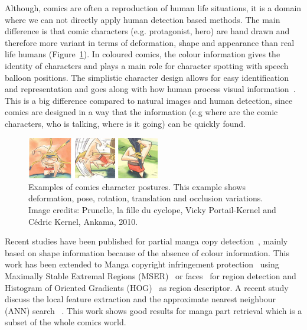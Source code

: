 Although, comics are often a reproduction of human life situations, it is a domain where we can not directly apply human detection based methods.
The main difference is that comic characters (e.g. protagonist, hero) are hand drawn and therefore more variant in terms of deformation, shape and appearance than real life humans (Figure~\ref{fig:sota:tarzan}).
In coloured comics, the colour information gives the identity of characters and plays a main role for character spotting with speech balloon positions. 
The simplistic character design allows for easy identification and representation and goes along with how human process visual information~\cite{ahmadimpactsOfManga,medley2010discerningPictures,cohn2010limits}.
This is a big difference compared to natural images and human detection, since comics are designed in a way that the information (e.g where are the comic characters, who is talking, where is it going) can be quickly found.%

 \begin{figure}[!ht]	%
 	 \centering
 	\includegraphics[width=220px]{figs/prunelle.png}
 	\caption[Illustration of the diversity of comics character postures]{Examples of comics character postures. This example shows deformation, pose, rotation, translation and occlusion variations. Image credits: Prunelle, la fille du cyclope, Vicky Portail-Kernel and C\'{e}dric Kernel, Ankama, 2010.
}
 	\label{fig:sota:tarzan}
 \end{figure}

Recent studies have been published for partial manga copy detection~\cite{Sun2010}, mainly based on shape information because of the absence of colour information.
This work has been extended to Manga copyright infringement protection~\cite{Sun2009Detecting,Sun2013IJDAR} using Maximally Stable Extremal Regions (MSER)~\cite{matas2004robust} or faces~\cite{Viola2004robust} for region detection and Histogram of Oriented Gradients (HOG)~\cite{Dalal05} as region descriptor.
A recent study discuss the local feature extraction and the approximate nearest neighbour (ANN) search~\cite{Iwata2014StudyManga} .
This work shows good results for manga part retrieval which is a subset of the whole comics world.

